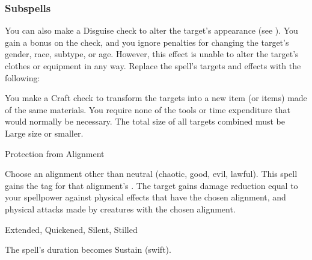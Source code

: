 \subsubsection{Subspells}
You can also make a Disguise check to alter the target's appearance (see ).
You gain a  bonus on the check, and you ignore penalties for changing the target's gender, race, subtype, or age.
However, this effect is unable to alter the target's clothes or equipment in any way.
Replace the spell's targets and effects with the following:
\begin{spellcontent}
\begin{augmenttargetinginfo}
\end{augmenttargetinginfo}
\begin{augmenteffects}
\spelleffect
You make a Craft check to transform the targets into a new item (or items) made of the same materials.
You require none of the tools or time expenditure that would normally be necessary.
The total size of all targets combined must be Large size or smaller.
\end{augmenteffects}
\end{spellcontent}
\begin{spellsection}{Protection from Alignment}
\begin{spellcontent}
\begin{spelltargetinginfo}
\end{spelltargetinginfo}
\begin{spelleffects}
\spellspecial
Choose an alignment other than neutral (chaotic, good, evil, lawful).
This spell gains the tag for that alignment's .
\spelleffect
The target gains damage reduction equal to your spellpower against physical effects that have the chosen alignment, and physical attacks made by creatures with the chosen alignment.
\end{spelleffects}
\end{spellcontent}
\begin{spellfooter}
 Extended, Quickened, Silent, Stilled
\end{spellfooter}
\begin{spellsubcontent}
\begin{spellcantrip}
The spell's duration becomes Sustain (swift).
\end{spellcantrip}
\end{spellsubcontent}
\end{spellsection}
